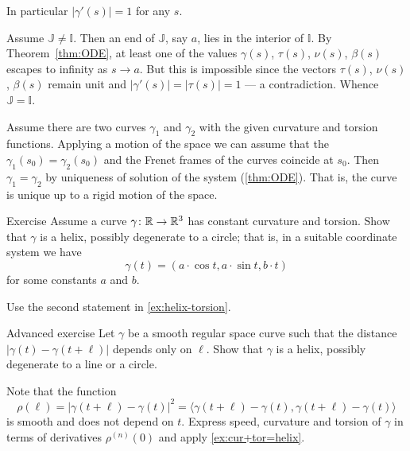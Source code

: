 In particular $|\gamma'(s)|=1$ for any $s$.

Assume $\mathbb{J}\ne \mathbb{I}$.
Then an end of $\mathbb{J}$, say $a$, lies in the interior of $\mathbb{I}$.
By Theorem~\ref{thm:ODE}, at least one of the values $\gamma(s)$, $\tau(s)$, $\nu(s)$, $\beta(s)$
escapes to infinity as $s\to a$.
But this is impossible since the vectors $\tau(s)$, $\nu(s)$, $\beta(s)$ remain unit and $|\gamma'(s)|=|\tau(s)|=1$ --- a contradiction.
Whence $\mathbb{J}= \mathbb{I}$.

Assume there are two curves $\gamma_1$ and $\gamma_2$ with the given curvature and torsion functions.
Applying a motion of the space we can assume that the $\gamma_1(s_0)=\gamma_2(s_0)$ and the Frenet frames of the curves coincide at $s_0$.
Then $\gamma_1=\gamma_2$ by uniqueness of solution of the system (\ref{thm:ODE}).
That is, the curve is unique up to a rigid motion of the space.
\qeds

\begin{thm}{Exercise}\label{ex:cur+tor=helix}
Assume a curve $\gamma\colon\mathbb{R}\to\mathbb{R}^3$ has constant curvature and torsion.
Show that $\gamma$ is a helix, possibly degenerate to a circle;
that is, in a suitable coordinate system we have
\[\gamma(t)=(a\cdot \cos t,a\cdot\sin t, b\cdot t)\]
for some constants $a$ and $b$.
\end{thm}

 Use the second statement in \ref{ex:helix-torsion}.


\begin{thm}{Advanced exercise}
Let $\gamma$ be a smooth regular space curve such that the distance $|\gamma(t)-\gamma(t+\ell)|$ depends only on $\ell$.
Show that $\gamma$ is a helix, possibly degenerate to a line or a circle.
\end{thm}

 Note that the function
\[\rho(\ell)=|\gamma(t+\ell)-\gamma(t)|^2=\langle \gamma(t+\ell)-\gamma(t),\gamma(t+\ell)-\gamma(t)\rangle\] 
is smooth and does not depend on $t$.
Express speed, curvature and torsion of $\gamma$ in terms of derivatives $\rho^{(n)}(0)$
and apply \ref{ex:cur+tor=helix}.
